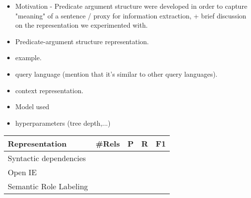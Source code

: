 \begin{itemize}
    \item Motivation - Predicate argument structure were developed in order to capture "meaning" of a sentence / proxy for information extraction, + brief discussion on the representation we experimented with.
    \item Predicate-argument structure representation.
    \item example.
    \item query language (mention that it's similar to other query languages).
    \item context representation.
    \item Model used 
    \item hyperparameters (tree depth,...)
\end{itemize}


\begin{table}[]
\begin{tabular}{@{}lllll@{}}
\toprule
Representation         & \#Rels & P & R & F1 \\ \midrule
Syntactic dependencies &             &           &        &    \\
Open IE                &             &           &        &    \\
Semantic Role Labeling  &             &           &        &    \\ \bottomrule
\end{tabular}
\end{table}